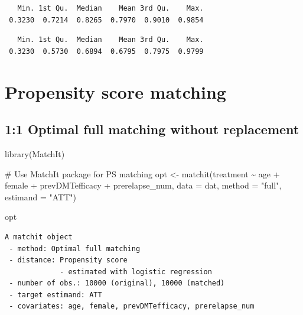 \documentclass[
  letterpaper,
  DIV=11,
  numbers=noendperiod]{scrreprt}
\newenvironment{Shaded}{\begin{snugshade}}{\end{snugshade}}
\newcommand{\AttributeTok}[1]{\textcolor[rgb]{0.40,0.45,0.13}{#1}}
\newcommand{\CommentTok}[1]{\textcolor[rgb]{0.37,0.37,0.37}{#1}}
\newcommand{\FunctionTok}[1]{\textcolor[rgb]{0.28,0.35,0.67}{#1}}
\newcommand{\NormalTok}[1]{\textcolor[rgb]{0.00,0.23,0.31}{#1}}
\newcommand{\OtherTok}[1]{\textcolor[rgb]{0.00,0.23,0.31}{#1}}
\newcommand{\SpecialCharTok}[1]{\textcolor[rgb]{0.37,0.37,0.37}{#1}}
\newcommand{\StringTok}[1]{\textcolor[rgb]{0.13,0.47,0.30}{#1}}
\begin{document}
\begin{verbatim}
   Min. 1st Qu.  Median    Mean 3rd Qu.    Max. 
 0.3230  0.7214  0.8265  0.7970  0.9010  0.9854 
\end{verbatim}

\begin{Shaded}
\end{Shaded}

\begin{verbatim}
   Min. 1st Qu.  Median    Mean 3rd Qu.    Max. 
 0.3230  0.5730  0.6894  0.6795  0.7975  0.9799 
\end{verbatim}

\hypertarget{propensity-score-matching}{%
\section{Propensity score matching}\label{propensity-score-matching}}

\hypertarget{optimal-full-matching-without-replacement}{%
\subsection{1:1 Optimal full matching without
replacement}\label{optimal-full-matching-without-replacement}}

\begin{Shaded}
\begin{Highlighting}[]
\FunctionTok{library}\NormalTok{(MatchIt)}

\CommentTok{\# Use MatchIt package for PS matching}
\NormalTok{opt }\OtherTok{\textless{}{-}} \FunctionTok{matchit}\NormalTok{(treatment }\SpecialCharTok{\textasciitilde{}}\NormalTok{ age }\SpecialCharTok{+}\NormalTok{ female }\SpecialCharTok{+}\NormalTok{ prevDMTefficacy }\SpecialCharTok{+}\NormalTok{ prerelapse\_num, }
               \AttributeTok{data =}\NormalTok{ dat, }
               \AttributeTok{method =} \StringTok{"full"}\NormalTok{,}
               \AttributeTok{estimand =} \StringTok{"ATT"}\NormalTok{)}

\NormalTok{opt}
\end{Highlighting}
\end{Shaded}

\begin{verbatim}
A matchit object
 - method: Optimal full matching
 - distance: Propensity score
             - estimated with logistic regression
 - number of obs.: 10000 (original), 10000 (matched)
 - target estimand: ATT
 - covariates: age, female, prevDMTefficacy, prerelapse_num
\end{verbatim}
\end{document}
